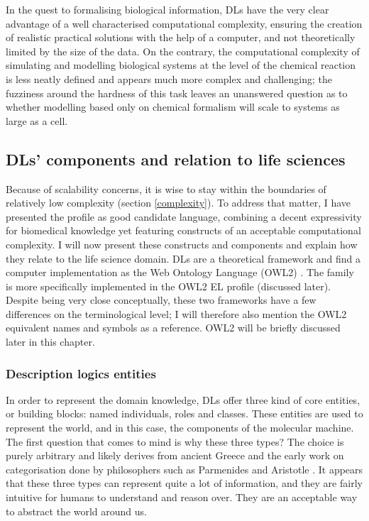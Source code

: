 In the quest to formalising biological information, DLs have the very clear advantage of a well characterised computational complexity, ensuring the creation of realistic practical solutions with the help of a computer, and not theoretically limited by the size of the data. On the contrary, the computational complexity of simulating and modelling biological systems at the level of the chemical reaction is less neatly defined \citep{meng2004modeling} \citep{gillespie2007stochastic} and appears much more complex and challenging; the fuzziness around the hardness of this task leaves an unanswered question as to whether modelling based only on chemical formalism will scale to systems as large as a cell.

\subsection{DLs' components and relation to life sciences}

Because of scalability concerns, it is wise to stay within the boundaries of relatively low complexity (section \ref{complexity}). To address that matter, I have presented the  profile as good candidate language, combining a decent expressivity for biomedical knowledge yet featuring constructs of an acceptable computational complexity. I will now present these constructs and components and explain how they relate to the life science domain. DLs are a theoretical framework and find a computer implementation as the Web Ontology Language (OWL2) \citep{owlw3c}. The  family is more specifically implemented in the OWL2 EL profile (discussed later).
Despite being very close conceptually, these two frameworks have a few differences on the terminological level; I will therefore also mention the OWL2 equivalent names and symbols as a reference. OWL2 will be briefly discussed later in this chapter.

\subsubsection{Description logics entities}
\label{coredl}

In order to represent the domain knowledge, DLs offer three kind of core entities, or building blocks: named individuals, roles and classes. These entities are used to represent the world, and in this case, the components of the molecular machine. The first question that comes to mind is why these three types? The choice is purely arbitrary and likely derives from ancient Greece and the early work on categorisation done by philosophers such as Parmenides and Aristotle \citep{ontologywiki}. It appears that these three types can represent quite a lot of information, and they are fairly intuitive for humans to understand and reason over. They are an acceptable way to abstract the world around us.

